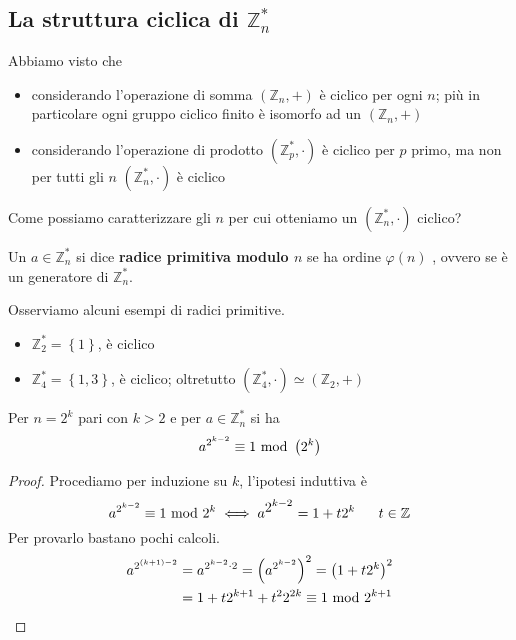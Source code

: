 \subsection{La struttura ciclica di $\mathbb{Z}_n^*$}
Abbiamo visto che 
\begin{itemize}
	\item considerando l'operazione di somma $\left(\mathbb{Z}_n,+\right)$ è ciclico per ogni $n$; più in particolare ogni gruppo ciclico finito è isomorfo ad un $\left(\mathbb{Z}_n,+\right)$
	\item considerando l'operazione di prodotto $\left(\mathbb{Z}_p^*,\cdot\right)$ è ciclico per $p$ primo, ma non per tutti gli $n$ $\left(\mathbb{Z}_n^*,\cdot\right)$ è ciclico
\end{itemize}
Come possiamo caratterizzare gli $n$ per cui otteniamo un $\left(\mathbb{Z}_n^*,\cdot\right)$ ciclico?
\begin{definizione}
	Un $a\in\mathbb{Z}_n^*$ si dice \textbf{radice primitiva modulo $n$} se ha ordine $\varphi(n)$
	, ovvero se è un generatore di $\mathbb{Z}_n^*$.
\end{definizione}
\begin{esempio}
	Osserviamo alcuni esempi di radici primitive.
	\begin{itemize}
		\item $\mathbb{Z}_2^*=\left\{1\right\}$, è ciclico
		\item $\mathbb{Z}_4^*=\left\{1,3\right\}$, è ciclico; oltretutto $\left(\mathbb{Z}_4^*,\cdot\right)\simeq\left(\mathbb{Z}_{2},+\right)$
	\end{itemize}
\end{esempio}
\begin{proposizione}
	Per $n=2^k$ pari con $k>2$ e per $a\in\mathbb{Z}_n^*$ si ha 
	\begin{equation*}
	a^{2^{k-2}}\equiv1\ \mathrm{mod}\ \left(2^k\right)
	\end{equation*} 
\end{proposizione}
\begin{proof}
	Procediamo per induzione su $k$, l'ipotesi induttiva è 
	\begin{equation*}
	a^{2^{k-2}}\equiv1\ \mathrm{mod}\ 2^k \iff a^{\displaystyle2^{k-2}}=1+t2^k \ \ \ \ \ t \in \mathbb{Z}
	\end{equation*}
	Per provarlo bastano pochi calcoli.
	\begin{align*}
	a^{2^{(k+1)-2}}&=a^{2^{k-2}\cdot2}=\left(a^{2^{k-2}}\right)^2=\left(1+t2^k\right)^2\\
	&= 1+t2^{k+1}+t^22^{2k}\equiv1\ \mathrm{mod}\ 2^{k+1}
	\end{align*}
\end{proof}
